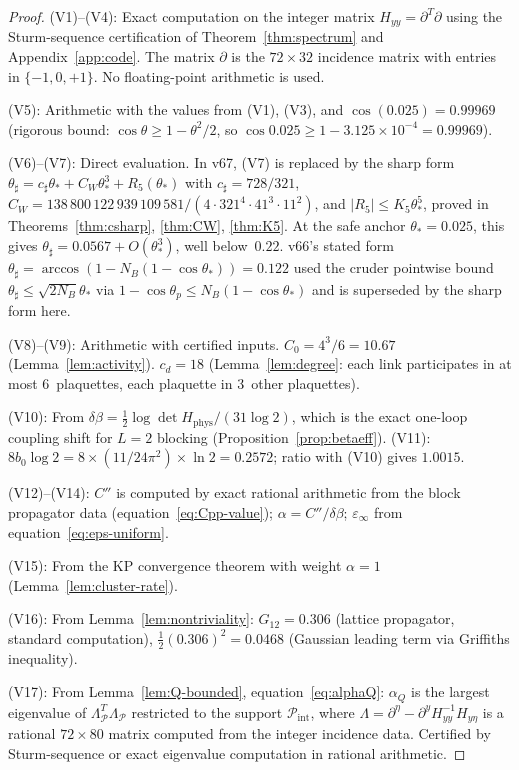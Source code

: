 \documentclass[11pt]{article}
\theoremstyle{definition}
\begin{document}
\begin{proof}
(V1)--(V4): Exact computation on the integer matrix
$H_{yy}=\partial^T\partial$ using the Sturm-sequence
certification of Theorem~\ref{thm:spectrum} and
Appendix~\ref{app:code}.  The matrix $\partial$ is the
$72\times 32$ incidence matrix with entries in
$\{-1,0,+1\}$.  No floating-point arithmetic is used.

(V5): Arithmetic with the values from (V1), (V3),
and $\cos(0.025)=0.99969$ (rigorous bound:
$\cos\theta\ge 1-\theta^2/2$, so
$\cos 0.025\ge 1-3.125\times 10^{-4}=0.99969$).

(V6)--(V7): Direct evaluation.  In v67, (V7) is replaced by the
sharp form $\theta_\sharp=c_\sharp\theta_*+C_W\theta_*^3+R_5(\theta_*)$
with $c_\sharp=728/321$, $C_W=138\,800\,122\,939\,109\,581/(4\cdot 321^4\cdot 41^3\cdot 11^2)$,
and $|R_5|\le K_5\theta_*^5$, proved in
Theorems~\ref{thm:csharp}, \ref{thm:CW}, \ref{thm:K5}.  At the safe
anchor $\theta_*=0.025$, this gives $\theta_\sharp=0.0567+O(\theta_*^3)$,
well below~$0.22$.  v66's stated form
$\theta_\sharp=\arccos(1-N_B(1-\cos\theta_*))=0.122$ used the cruder
pointwise bound $\theta_\sharp\le\sqrt{2N_B}\theta_*$ via
$1-\cos\theta_p\le N_B(1-\cos\theta_*)$ and is superseded by the
sharp form here.

(V8)--(V9): Arithmetic with certified inputs.  $C_0=4^3/6=10.67$
(Lemma~\ref{lem:activity}).  $c_d=18$
(Lemma~\ref{lem:degree}: each link participates in at most
6~plaquettes, each plaquette in 3~other plaquettes).

(V10): From $\delta\beta=\frac{1}{2}\log\det H_{\mathrm{phys}}/
(31\log 2)$, which is the exact one-loop coupling shift
for $L=2$ blocking (Proposition~\ref{prop:betaeff}).
(V11): $8b_0\log 2=8\times(11/24\pi^2)\times\ln 2
=0.2572$; ratio with (V10) gives $1.0015$.

(V12)--(V14): $C''$ is computed by exact rational arithmetic
from the block propagator data
(equation~\eqref{eq:Cpp-value});
$\alpha=C''/\delta\beta$; $\varepsilon_\infty$ from
equation~\eqref{eq:eps-uniform}.

(V15): From the KP convergence theorem with weight $\alpha=1$
(Lemma~\ref{lem:cluster-rate}).

(V16): From Lemma~\ref{lem:nontriviality}: $G_{12}=0.306$
(lattice propagator, standard computation),
$\frac{1}{2}(0.306)^2=0.0468$ (Gaussian leading term
via Griffiths inequality).

(V17): From Lemma~\ref{lem:Q-bounded},
equation~\eqref{eq:alphaQ}: $\alpha_Q$ is the largest
eigenvalue of $\Lambda_{\mathcal{P}}^T\Lambda_{\mathcal{P}}$
restricted to the support $\mathcal{P}_{\mathrm{int}}$,
where $\Lambda=\partial^\eta-\partial^y H_{yy}^{-1}H_{y\eta}$
is a rational $72\times 80$ matrix computed from the integer
incidence data.  Certified by Sturm-sequence or exact
eigenvalue computation in rational arithmetic.
\end{proof}
\end{document}
